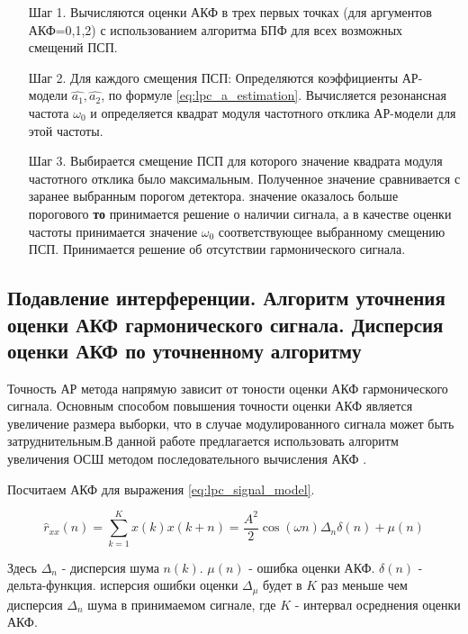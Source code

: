 \begin{itemize}
\item[Шаг 1.] Вычисляются оценки  АКФ в трех первых точках (для аргументов АКФ=0,1,2)
	с использованием алгоритма БПФ для всех возможных смещений ПСП. 
\item[Шаг 2.] Для каждого смещения ПСП: 
	Определяются коэффициенты АР-модели ${\hat{a_1}, \hat{a_2}}$, 
	по формуле \ref{eq:lpc_a_estimation}. 
	Вычисляется резонансная частота ${\omega_0}$
	и определяется квадрат модуля частотного отклика АР-модели для этой частоты. 
\item[Шаг 3.] Выбирается смещение ПСП для которого значение квадрата модуля частотного отклика было максимальным. Полученное значение сравнивается с заранее выбранным порогом детектора. 
	  значение оказалось больше порогового {\bf{то}} 
		принимается решение о наличии сигнала, а в качестве оценки
		частоты принимается значение ${\omega_0}$ соответствующее выбранному смещению ПСП. 
		Принимается решение об отсутствии гармонического сигнала.
\end{itemize}

\subsection{Подавление интерференции. Алгоритм уточнения оценки АКФ гармонического сигнала.
		Дисперсия оценки АКФ по уточненному алгоритму}

Точность АР метода напрямую зависит от тоности оценки АКФ гармонического сигнала. Основным способом повышения точности оценки АКФ является увеличение размера выборки,
что в случае модулированного сигнала может быть затруднительным.В данной работе предлагается использовать алгоритм увеличения ОСШ методом последовательного вычисления
АКФ \cite{ostanin_akf}.

Посчитаем АКФ для выражения \ref{eq:lpc_signal_model}.

\begin{center}
\begin{equation}
	\label{eq:lpc_akf_n}
	\hat{r}_{xx}(n) = \sum \limits_{k=1}^{K} x(k)x(k+n) = \frac{A^2}{2} \cos{(\omega{n})} \Delta_n \delta{(n)} + \mu{(n)}
\end{equation}
\end{center}

Здесь ${\Delta_n}$ - дисперсия шума ${n(k)}$. ${\mu{(n)}}$ - ошибка оценки АКФ. ${\delta{(n)}}$ - дельта-функция. исперсия ошибки
оценки ${\Delta_{\mu}}$ будет в ${K}$ раз меньше чем дисперсия ${\Delta_n}$ шума в принимаемом сигнале, где ${K}$ - интервал
осреднения оценки АКФ.

